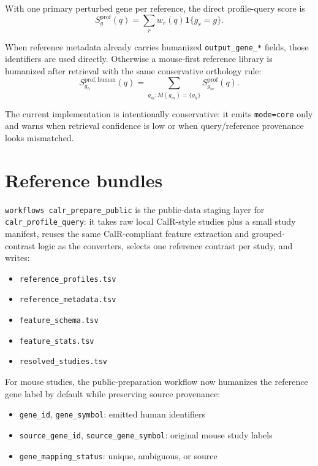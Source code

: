 \documentclass[11pt]{article}
\begin{document}
With one primary perturbed gene per reference, the direct profile-query score is
\begin{equation}
S^{\mathrm{prof}}_g(q) = \sum_r w_r(q)\mathbf{1}\{g_r = g\}.
\end{equation}

When reference metadata already carries humanized \texttt{output\_gene\_*} fields, those identifiers are used directly. Otherwise a mouse-first reference library is humanized after retrieval with the same conservative orthology rule:
\begin{equation}
S^{\mathrm{prof,human}}_{g_h}(q) = \sum_{g_m : M(g_m)=\{g_h\}} S^{\mathrm{prof}}_{g_m}(q).
\end{equation}

The current implementation is intentionally conservative: it emits \texttt{mode=core} only and warns when retrieval confidence is low or when query/reference provenance looks mismatched.

\section{Reference bundles}
\texttt{workflows calr\_prepare\_public} is the public-data staging layer for \texttt{calr\_profile\_query}: it takes raw local CalR-style studies plus a small study manifest, reuses the same CalR-compliant feature extraction and grouped-contrast logic as the converters, selects one reference contrast per study, and writes:
\begin{itemize}[leftmargin=2em]
\item \texttt{reference\_profiles.tsv}
\item \texttt{reference\_metadata.tsv}
\item \texttt{feature\_schema.tsv}
\item \texttt{feature\_stats.tsv}
\item \texttt{resolved\_studies.tsv}
\end{itemize}

For mouse studies, the public-preparation workflow now humanizes the reference gene label by default while preserving source provenance:
\begin{itemize}[leftmargin=2em]
\item \texttt{gene\_id}, \texttt{gene\_symbol}: emitted human identifiers
\item \texttt{source\_gene\_id}, \texttt{source\_gene\_symbol}: original mouse study labels
\item \texttt{gene\_mapping\_status}: unique, ambiguous, or source
\end{itemize}
\end{document}
